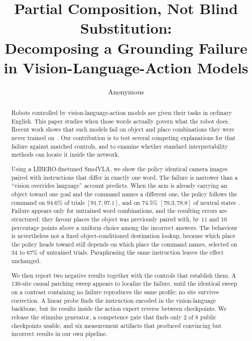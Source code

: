 \documentclass{article}
\title{Partial Composition, Not Blind Substitution:\\
Decomposing a Grounding Failure in Vision-Language-Action Models}
\author{%
  Anonymous \\
}
\begin{document}
\maketitle

\begin{abstract}
Robots controlled by vision-language-action models are given their tasks in ordinary English.
This paper studies when those words actually govern what the robot does. Recent work shows
that such models fail on object and place combinations they were never trained
on~\citep{brittle,scaleup}. Our contribution is to test several competing explanations for
that failure against matched controls, and to examine whether standard interpretability
methods can locate it inside the network.

Using a LIBERO-finetuned SmolVLA, we show the policy identical camera images paired with
instructions that differ in exactly one word. The failure is narrower than a
``vision overrides language'' account predicts. When the arm is already carrying an object
toward one goal and the command names a different one, the policy follows the command on
$94.6\%$ of trials $[91.7, 97.1]$, and on $74.5\%$ $[70.3, 78.8]$ of neutral
states~\citep{notallfeatures}. Failure appears only for untrained word combinations, and the
resulting errors are structured: they favour places the object was previously paired with, by
$11$ and $10$ percentage points above a uniform choice among the incorrect answers. The
behaviour is nevertheless not a fixed object-conditioned destination lookup, because which
place the policy heads toward still depends on which place the command names, selected on
$34$ to $67\%$ of untrained trials. Paraphrasing the same instruction leaves the effect
unchanged.

We then report two negative results together with the controls that establish them. A
130-site causal patching sweep appears to localize the failure, until the identical sweep on a
contrast containing no failure reproduces the same profile; no site survives correction. A
linear probe finds the instruction encoded in the vision-language backbone, but its results
inside the action expert reverse between checkpoints. We release the stimulus generator, a
competence gate that finds only $2$ of $8$ public checkpoints usable, and six measurement
artifacts that produced convincing but incorrect results in our own pipeline.
\end{abstract}
\end{document}
